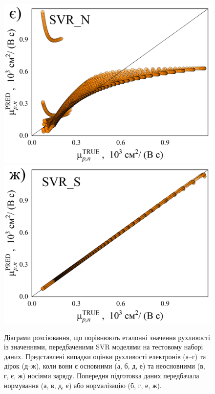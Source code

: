 \documentclass[12pt,a4paper,titlepage,oneside]{book}
\numberwithin{equation}{part}
\begin{document}
\begin{figure}
     \includegraphics[width=0.35\linewidth]{SVRNpn.png}\kern 20pt
     \includegraphics[width=0.35\linewidth]{SVRSpn.png}
	  \caption{Діаграми розсіювання, що порівнюють еталонні значення рухливості із значеннями, передбаченими SVR моделями
       на тестовому наборі даних.
       Представлені випадки оцінки рухливості електронів (а--г) та дірок (д--ж), коли вони є
       основними (а, б, д, е) та неосновними (в, г, є, ж) носіями заряду.
       Попередня підготовка даних передбачала нормування (а, в, д, є) або нормалізацію (б, г, е, ж).
}\label{figSVR}
\end{figure}
\end{document}
